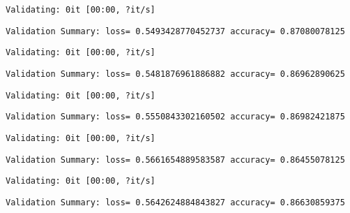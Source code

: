 \documentclass[11pt]{article}
\begin{document}
    
    \begin{Verbatim}[commandchars=\\\{\}]
Validating: 0it [00:00, ?it/s]
    \end{Verbatim}

    
    \begin{Verbatim}[commandchars=\\\{\}]
Validation Summary: loss= 0.5493428770452737 accuracy= 0.87080078125
    \end{Verbatim}

    
    \begin{Verbatim}[commandchars=\\\{\}]
Validating: 0it [00:00, ?it/s]
    \end{Verbatim}

    
    \begin{Verbatim}[commandchars=\\\{\}]
Validation Summary: loss= 0.5481876961886882 accuracy= 0.86962890625
    \end{Verbatim}

    
    \begin{Verbatim}[commandchars=\\\{\}]
Validating: 0it [00:00, ?it/s]
    \end{Verbatim}

    
    \begin{Verbatim}[commandchars=\\\{\}]
Validation Summary: loss= 0.5550843302160502 accuracy= 0.86982421875
    \end{Verbatim}

    
    \begin{Verbatim}[commandchars=\\\{\}]
Validating: 0it [00:00, ?it/s]
    \end{Verbatim}

    
    \begin{Verbatim}[commandchars=\\\{\}]
Validation Summary: loss= 0.5661654889583587 accuracy= 0.86455078125
    \end{Verbatim}

    
    \begin{Verbatim}[commandchars=\\\{\}]
Validating: 0it [00:00, ?it/s]
    \end{Verbatim}

    
    \begin{Verbatim}[commandchars=\\\{\}]
Validation Summary: loss= 0.5642624884843827 accuracy= 0.86630859375
    \end{Verbatim}
\end{document}
